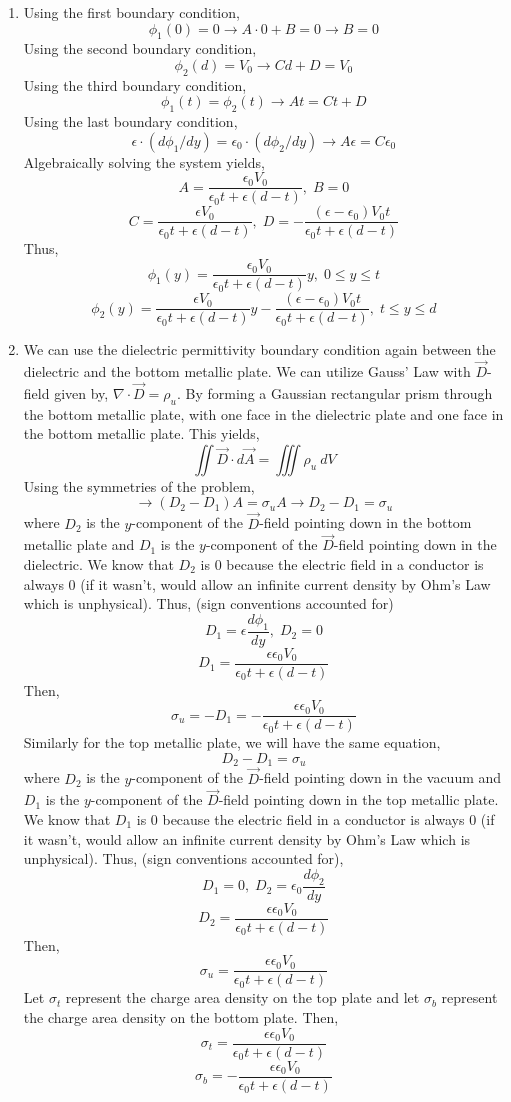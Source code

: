 \documentclass[12pt]{article}
\begin{document}
\begin{enumerate}
\begin{enumerate}
		\item [c.]
		Using the first boundary condition,
		\[\phi_1(0)= 0 \to A\cdot 0 + B = 0 \to B=0\]
		Using the second boundary condition,
		\[\phi_2(d)=V_0 \to Cd + D = V_0\]
		Using the third boundary condition,
		\[\phi_1(t)=\phi_2(t) \to At=Ct+D\]
		Using the last boundary condition,
		\[\epsilon\cdot(d\phi_1/dy)=\epsilon_0\cdot (d\phi_2/dy)\to A\epsilon = C\epsilon_0\]
		Algebraically solving the system yields,
		\[\boxed{A=\frac{\epsilon_0 V_0}{\epsilon_0 t + \epsilon(d -t)}, \; B = 0}\]
		\[\boxed{C = \frac{\epsilon V_0}{\epsilon_0 t + \epsilon(d-t)}, \; D=-\frac{(\epsilon-\epsilon_0)V_0t}{\epsilon_0 t+\epsilon(d-t)}}\]
		Thus,
		\[\boxed{\phi_1(y)=\frac{\epsilon_0 V_0}{\epsilon_0 t + \epsilon(d -t)} y, \; 0 \leq y \leq t}\]
		\[\boxed{\phi_2(y) = \frac{\epsilon V_0}{\epsilon_0 t + \epsilon(d-t)} y -\frac{(\epsilon-\epsilon_0)V_0t}{\epsilon_0 t+\epsilon(d-t)}, \; t\leq y \leq d}\]

		\item [d.]
		We can use the dielectric permittivity boundary condition again between the dielectric and the bottom metallic plate.
		We can utilize Gauss' Law with $\vec D$-field given by, $\nabla \cdot \vec D = \rho_u$.
		By forming a Gaussian rectangular prism through the bottom metallic plate, with one face in the dielectric plate and one face in the bottom metallic plate.
		This yields,
		\[\iint \vec D \cdot d\vec  A = \iiint \rho_u \: dV\]
		Using the symmetries of the problem,
		\[\to (D_2-D_1)A=\sigma_uA \to D_2-D_1 = \sigma_u\]
		where $D_2$ is the $y$-component of the $\vec D$-field pointing down in the bottom metallic plate and $D_1$ is the $y$-component of the $\vec D$-field pointing down in the dielectric.
		We know that $D_2$ is $0$ because the electric field in a conductor is always $0$ (if it wasn't, would allow an infinite current density by Ohm's Law which is unphysical).
		Thus, (sign conventions accounted for)
		\[D_1 = \epsilon\frac{d\phi_1}{dy}, \; D_2 = 0\]
		\[D_1 = \frac{\epsilon\epsilon_0 V_0}{\epsilon_0 t + \epsilon(d -t)}\]
		Then,
		\[\sigma_u = -D_1 = -\frac{\epsilon\epsilon_0 V_0}{\epsilon_0 t + \epsilon(d -t)}\]
		Similarly for the top metallic plate, we will have the same equation,
		\[D_2-D_1= \sigma_u\]
		where $D_2$ is the $y$-component of the $\vec D$-field pointing down in the vacuum and $D_1$ is the $y$-component of the $\vec D$-field pointing down in the top metallic plate.
		We know that $D_1$ is $0$ because the electric field in a conductor is always $0$ (if it wasn't, would allow an infinite current density by Ohm's Law which is unphysical).
		Thus, (sign conventions accounted for),
		\[D_1 = 0, \; D_2 = \epsilon_0\frac{d\phi_2}{dy}\]
		\[D_2 = \frac{\epsilon\epsilon_0 V_0}{\epsilon_0 t + \epsilon(d-t)}\]
		Then,
		\[\sigma_u = \frac{\epsilon\epsilon_0 V_0}{\epsilon_0 t + \epsilon(d-t)}\]
		Let $\sigma_t$ represent the charge area density on the top plate and let $\sigma_b$ represent the charge area density on the bottom plate.
		Then,
		\[\boxed{\sigma_t = \frac{\epsilon\epsilon_0 V_0}{\epsilon_0 t + \epsilon(d-t)}}\]
		\[\boxed{\sigma_b = -\frac{\epsilon\epsilon_0 V_0}{\epsilon_0 t + \epsilon(d-t)}}\]


\end{enumerate}
\end{enumerate}
\end{document}
